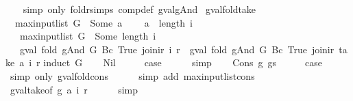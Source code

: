 \begin{isabellebody}
\ \ \isamarkupfalse%
\ {\isacharparenleft}simp\ only{\isacharcolon}\ foldr{\isachardot}simps\ comp{\isacharunderscore}def\ gval{\isacharunderscore}gAnd{\isacharparenright}%
\endisatagproof
{\isafoldproof}%
%
\isadelimproof
\isanewline
%
\endisadelimproof
\isanewline
{}\isamarkupfalse%
\ gval{\isacharunderscore}fold{\isacharunderscore}take{\isacharcolon}\isanewline
\ \ {\isachardoublequoteopen}max{\isacharunderscore}input{\isacharunderscore}list\ G\ {\isacharless}\ Some\ a\ {\isasymLongrightarrow}\isanewline
\ \ \ a\ {\isasymle}\ length\ i\ {\isasymLongrightarrow}\isanewline
\ \ \ max{\isacharunderscore}input{\isacharunderscore}list\ G\ {\isasymle}\ Some\ {\isacharparenleft}length\ i{\isacharparenright}\ {\isasymLongrightarrow}\isanewline
\ \ \ gval\ {\isacharparenleft}fold\ gAnd\ G\ {\isacharparenleft}Bc\ True{\isacharparenright}{\isacharparenright}\ {\isacharparenleft}join{\isacharunderscore}ir\ i\ r{\isacharparenright}\ {\isacharequal}\ gval\ {\isacharparenleft}fold\ gAnd\ G\ {\isacharparenleft}Bc\ True{\isacharparenright}{\isacharparenright}\ {\isacharparenleft}join{\isacharunderscore}ir\ {\isacharparenleft}take\ a\ i{\isacharparenright}\ r{\isacharparenright}{\isachardoublequoteclose}\isanewline
%
\isadelimproof
%
\endisadelimproof
%
\isatagproof
{}\isamarkupfalse%
{\isacharparenleft}induct\ G{\isacharparenright}\isanewline
\ \ \isamarkupfalse%
\ Nil\isanewline
\ \ \isamarkupfalse%
\ \isamarkupfalse%
\ {\isacharquery}case\isanewline
\ \ \ \ \isamarkupfalse%
\ simp\isanewline
{}\isamarkupfalse%
\isanewline
\ \ \isamarkupfalse%
\ {\isacharparenleft}Cons\ g\ gs{\isacharparenright}\isanewline
\ \ \isamarkupfalse%
\ \isamarkupfalse%
\ {\isacharquery}case\isanewline
\ \ \ \ \isamarkupfalse%
\ {\isacharparenleft}simp\ only{\isacharcolon}\ gval{\isacharunderscore}fold{\isacharunderscore}cons{\isacharparenright}\isanewline
\ \ \ \ \isamarkupfalse%
\ {\isacharparenleft}simp\ add{\isacharcolon}\ max{\isacharunderscore}input{\isacharunderscore}list{\isacharunderscore}cons{\isacharparenright}\isanewline
\ \ \ \ \isamarkupfalse%
\ gval{\isacharunderscore}take{\isacharbrackleft}of\ g\ a\ i\ r{\isacharbrackright}\isanewline
\ \ \ \ \isamarkupfalse%
\ simp\isanewline
{}\isamarkupfalse%
%
\endisatagproof
{\isafoldproof}%
%
\isadelimproof
\isanewline
%
\endisadelimproof
\isanewline
{}\isamarkupfalse%

\end{isabellebody}
